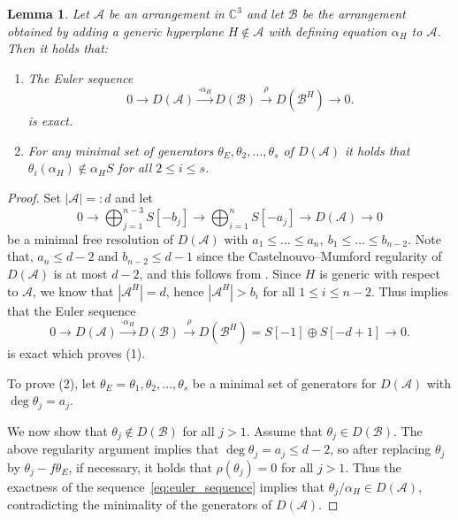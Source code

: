 \documentclass[a4paper,11pt]{amsart}
\def\CC{{\mathbb{C}}}%
\def\C{{\mathbb{C}}}%
\def\A{{\mathcal{A}}}%
\def\B{{\mathcal{B}}}%
\def\C{{\mathcal{C}}}%
\numberwithin{equation}{section}
\newtheorem{lemma}[theorem]{Lemma}
\theoremstyle{remark}
\begin{document}
\begin{lemma}\label{lem:comb_generic}
	Let $\A$ be an arrangement in $\CC^3$ and let $\B$ be the arrangement obtained by adding a generic hyperplane $H\notin \A$ with defining equation $\alpha_H$ to $\A$.
	Then it holds that:
	\begin{enumerate}
		\item The Euler sequence
		\[
		0 \rightarrow D(\A) \stackrel{\cdot \alpha_{H}}{\rightarrow }
		D(\B) \stackrel{\rho}{\rightarrow } D(\B^{H})\rightarrow 0.
		\]
		is exact.
		\item  For any minimal set of generators $\theta_E,\theta_2,\dots,\theta_s$ of $D(\A)$ it holds that $\theta_i(\alpha_H)\notin \alpha_H S$ for all $2\le i \le s$.
	\end{enumerate}
\end{lemma}
\begin{proof}
	Set $|\A|=:d$ and let 
	$$
	0 \rightarrow 
	\bigoplus_{j=1}^{n -3} S[-b_j]
	\rightarrow 
	\bigoplus_{i=1}^{n} S[-a_j]
	\rightarrow D(\A) \rightarrow 0
	$$
	be a minimal free resolution of $D(\A)$ with 
	$a_1 \le \ldots \le a_{n},\ 
	b_1 \le \ldots \le b_{n -2}$.
	Note that, $a_{n} \le d-2$ and 
	$b_{n -2} \le d-1$ since the Castelnouvo--Mumford regularity of $D(\A)$ is at most $d-2$, and this follows from .
	Since $H$ is generic with respect to $\A$, we know that $|\A^H|=d$, hence $|\A^H|>b_i$ for all $1\le i \le n-2$.
	Thus \Cref{ADPTT} implies that the Euler sequence
		\begin{equation}\label{eq:euler_sequence}
				0 \rightarrow D(\A) \stackrel{\cdot \alpha_{H}}{\rightarrow }
				D(\B) \stackrel{\rho}{\rightarrow } D(\B^{H})=S[-1]
				\oplus S[-d+1] \rightarrow 0.
			\end{equation}
			 is exact which proves (1).

	To prove (2), let $\theta_E=\theta_1,\theta_2,\dots,\theta_{s}$ be a minimal set of generators for $D(\A)$ with $\deg \theta_j=a_j$.
	
	We now show that $\theta_j \not \in D(\B)$ for all $j >1$.
	Assume that $\theta_j \in D(\B)$.
	The above regularity argument implies that $\deg \theta_j=a_j \le d-2$, so after replacing 
	$\theta_j$ by $\theta_j-f \theta_E$, if necessary, it holds that $\rho(\theta_j)=0$ for all $j>1$.
	Thus the exactness of the sequence~\eqref{eq:euler_sequence} implies that $\theta_j/\alpha_{H} \in D(\A)$, contradicting the minimality of the generators of $D(\A)$.
\end{proof}
\end{document}
